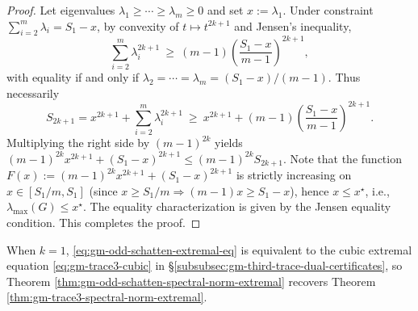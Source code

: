 \begin{proof}
Let eigenvalues \(\lambda_1\ge\cdots\ge\lambda_m\ge 0\) and set \(x:=\lambda_1\).
Under constraint \(\sum_{i=2}^m\lambda_i=S_1-x\), by convexity of \(t\mapsto t^{2k+1}\) and Jensen's inequality,
\[
\sum_{i=2}^m\lambda_i^{2k+1}\ \ge\ (m-1)\left(\frac{S_1-x}{m-1}\right)^{2k+1},
\]
with equality if and only if \(\lambda_2=\cdots=\lambda_m=(S_1-x)/(m-1)\).
Thus necessarily
\[
S_{2k+1}
=x^{2k+1}+\sum_{i=2}^m\lambda_i^{2k+1}
\ \ge\ x^{2k+1}+(m-1)\left(\frac{S_1-x}{m-1}\right)^{2k+1}.
\]
Multiplying the right side by \((m-1)^{2k}\) yields
\(
(m-1)^{2k}x^{2k+1}+(S_1-x)^{2k+1}\le (m-1)^{2k}S_{2k+1}
\).
Note that the function
\(
F(x):=(m-1)^{2k}x^{2k+1}+(S_1-x)^{2k+1}
\)
is strictly increasing on \(x\in[S_1/m,S_1]\) (since \(x\ge S_1/m\Rightarrow (m-1)x\ge S_1-x\)), hence \(x\le x^\star\), i.e., \(\lambda_{\max}(G)\le x^\star\).
The equality characterization is given by the Jensen equality condition. This completes the proof.
\end{proof}

\begin{remark}
When \(k=1\), \eqref{eq:gm-odd-schatten-extremal-eq} is equivalent to the cubic extremal equation \eqref{eq:gm-trace3-cubic} in \S\ref{subsubsec:gm-third-trace-dual-certificates}, so Theorem \ref{thm:gm-odd-schatten-spectral-norm-extremal} recovers Theorem \ref{thm:gm-trace3-spectral-norm-extremal}.
\end{remark}

